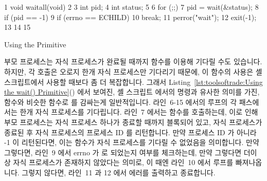 \begin{listing}[tbp]
{ \scriptsize
\begin{verbbox}
  1 void waitall(void)
  2 {
  3   int pid;
  4   int status;
  5 
  6   for (;;) {
  7     pid = wait(&status);
  8     if (pid == -1) {
  9       if (errno == ECHILD)
 10         break;
 11       perror("wait");
 12       exit(-1);
 13     }
 14   }
 15 }
\end{verbbox}
}
\centering
\theverbbox
\caption{Using the  Primitive}
\label{lst:toolsoftrade:Using the wait() Primitive}
\end{listing}

부모 프로세스는 자식 프로세스가 완료될 때까지  함수를 이용해 기다릴
수도 있습니다.
하지만, 각  호출은 오로지 한개 자식 프로세스만 기다리기 때문에, 이
함수의 사용은 셸 스크립트에서 사용할 때보다 좀 더 복잡합니다.
그래서
Listing~\ref{lst:toolsoftrade:Using the wait() Primitive}()
에서 보여진, 셸 스크립트 에서의  명령과 유사한 의미를 가진,
 함수와 비슷한 함수로  를 감싸는게 일반적입니다.
라인~6-15 에서의 루프의 각 패스에서는 한개 자식 프로세스를 기다립니다.
라인~7 에서는  함수를 호출하는데, 이로 인해 부모 프로세스는 자식
프로세스 하나가 종료할 때까지 블록되어 있고, 자식 프로세스가 종료된 후 자식
프로세스의 프로세스 ID 를 리턴합니다.
만약 프로세스 ID 가 아니라 -1 이 리턴된다면, 이는  함수가 자식
프로세스를 기다릴 수 없었음을 의미합니다.
만약 그렇다면, 라인~9 에서 errno 가  로 되었는지 여부를 체크하는데,
만약 그렇다면 더이상 자식 프로세스가 존재하지 않았다는 의미로, 이 때엔 라인~10
에서 루프를 빠져나옵니다.
그렇지 않다면, 라인~11 과 12 에서 에러를 출력하고 종료합니다.

